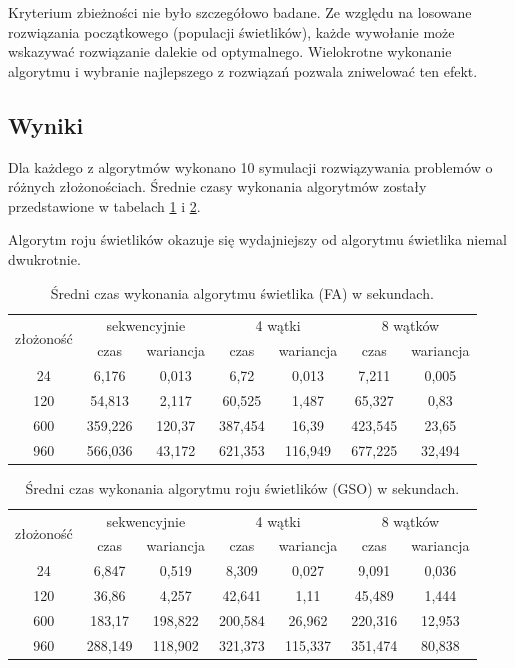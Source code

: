 \documentclass[11pt,a4paper,twoside]{article}
\begin{document}
Kryterium zbieżności nie było szczegółowo badane. Ze względu na losowane rozwiązania początkowego (populacji świetlików), każde wywołanie może wskazywać rozwiązanie dalekie od optymalnego. Wielokrotne wykonanie algorytmu i wybranie najlepszego z rozwiązań pozwala zniwelować ten efekt.

\subsection{Wyniki}
Dla każdego z algorytmów wykonano 10 symulacji rozwiązywania problemów o różnych złożonościach. Średnie czasy wykonania algorytmów zostały przedstawione w tabelach \ref{MPIwspólnaFA} i \ref{MPIwspólnaGSO}.

Algorytm roju świetlików okazuje się wydajniejszy od algorytmu świetlika niemal dwukrotnie. 

\bgroup
\def\arraystretch{1.1}
\begin{table}[ht]
\caption{Średni czas wykonania algorytmu świetlika (FA) w sekundach.}
\label{MPIwspólnaFA}
\centering
\begin{tabular}{|c||c|c||c|c||c|c|}
\hline
 \multirow{2}{*}{złożoność} & \multicolumn{2}{c||}{sekwencyjnie} & \multicolumn{2}{c||}{4 wątki} & \multicolumn{2}{c|}{8 wątków} \\\cline{2-7}
 & czas & wariancja & czas & wariancja & czas & wariancja \\\hline
 24 & 6,176 & 0,013 & 6,72 & 0,013 & 7,211 & 0,005\\\hline
 120 & 54,813 & 2,117 & 60,525 & 1,487 & 65,327 & 0,83 \\\hline
 600 & 359,226 & 120,37 & 387,454 & 16,39 & 423,545 & 23,65 \\\hline
 960 & 566,036 & 43,172 & 621,353 & 116,949 & 677,225 & 32,494\\\hline
\end{tabular}
\end{table}
\egroup

\bgroup
\def\arraystretch{1.1}
\begin{table}[ht]
\caption{Średni czas wykonania algorytmu roju świetlików (GSO) w sekundach.}
\label{MPIwspólnaGSO}
\centering
\begin{tabular}{|c||c|c||c|c||c|c|}
\hline
 \multirow{2}{*}{złożoność} & \multicolumn{2}{c||}{sekwencyjnie} & \multicolumn{2}{c||}{4 wątki} & \multicolumn{2}{c|}{8 wątków} \\\cline{2-7}
 & czas & wariancja & czas & wariancja & czas & wariancja \\\hline
 24 & 6,847 & 0,519 & 8,309 & 0,027 & 9,091 & 0,036 \\\hline
 120 & 36,86 & 4,257 & 42,641 & 1,11 & 45,489 & 1,444 \\\hline
 600 & 183,17 & 198,822 & 200,584 & 26,962 & 220,316 & 12,953 \\\hline
 960 & 288,149 & 118,902 & 321,373 & 115,337 & 351,474 & 80,838\\\hline
\end{tabular}
\end{table}
\egroup
\end{document}
